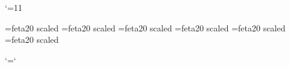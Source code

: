 %
%
%
%
%
\immediate{}%

\edef\catcodeat{\the\catcode`\@}\catcode`\@=11
\catcodesmusic


\font\fetaeleven=feta20 scaled \magstephalf
\font\fetathirteen=feta20 scaled 
\font\fetasixteen=feta20 scaled 
\font\fetatwenty=feta20 scaled 
\font\fetatwentyfour=feta20 scaled 
\font\fetatwentynine=feta20 scaled 

\let\fetanorfont\fetatwenty
\def\fetachar{\fetafont\char}   


\def\writ@ka{\pl@base\raise\y@i\llap{\fetachar\n@v\kern\accshift}}
\def\set@ka{\let\@Ti=\writ@ka}

\def\shtanini#1{\set@ka \n@v30 \check@staff \inhgetn@i#1\relax\expandafter\@Ti\fi}
\def\shbuyukmucenneb#1{\set@ka \n@v26 \check@staff \inhgetn@i#1\relax\expandafter\@Ti\fi}
\def\shkucuk#1{\set@ka \n@v27 \check@staff \inhgetn@i#1\relax\expandafter\@Ti\fi}
\def\shbakiye#1{\set@ka \n@v20 \check@staff \inhgetn@i#1\relax\expandafter\@Ti\fi}
\def\shkoma#1{\set@ka \n@v25 \check@staff \inhgetn@i#1\relax\expandafter\@Ti\fi}
\def\flkoma#1{\set@ka \n@v45 \check@staff \inhgetn@i#1\relax\expandafter\@Ti\fi}
\def\flbakiye#1{\set@ka \n@v42 \check@staff \inhgetn@i#1\relax\expandafter\@Ti\fi}
\def\flkucuk#1{\set@ka \n@v37 \check@staff \inhgetn@i#1\relax\expandafter\@Ti\fi}
\def\flbuyukmucenneb#1{\set@ka \n@v43 \check@staff \inhgetn@i#1\relax\expandafter\@Ti\fi}
\def\fltanini#1{\set@ka \n@v47 \check@staff \inhgetn@i#1\relax\expandafter\@Ti\fi}

\let\fetafont\fetanorfont

\endcatcodesmusic
\catcode`\@=\catcodeat
\endinput
